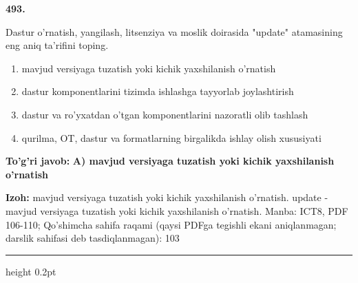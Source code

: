 \documentclass[10pt,a4paper]{article}
\begin{document}
{\bfseries\sffamily\color{ink} 493.}
\par
Dastur o'rnatish, yangilash, litsenziya va moslik doirasida "update" atamasining eng aniq ta'rifini toping.
\begin{enumerate}[label=\Alph*),leftmargin=9mm]
\item mavjud versiyaga tuzatish yoki kichik yaxshilanish o'rnatish
\item dastur komponentlarini tizimda ishlashga tayyorlab joylashtirish
\item dastur va ro'yxatdan o'tgan komponentlarini nazoratli olib tashlash
\item qurilma, OT, dastur va formatlarning birgalikda ishlay olish xususiyati
\end{enumerate}
\begin{tcolorbox}[enhanced,breakable,colback=teal!4,colframe=teal!60!black,boxrule=0.45pt,arc=1.2mm,left=2.7mm,right=2.7mm,top=1.8mm,bottom=1.8mm,before skip=2mm,after skip=2mm]
{\bfseries\sffamily\color{teal}To'g'ri javob:} \textbf{A) mavjud versiyaga tuzatish yoki kichik yaxshilanish o'rnatish}
\par\smallskip
{\bfseries Izoh:} mavjud versiyaga tuzatish yoki kichik yaxshilanish o'rnatish. update - mavjud versiyaga tuzatish yoki kichik yaxshilanish o'rnatish. Manba: ICT8, PDF 106-110; Qo'shimcha sahifa raqami (qaysi PDFga tegishli ekani aniqlanmagan; darslik sahifasi deb tasdiqlanmagan): 103
\end{tcolorbox}
\vspace{2mm}\hrule height 0.2pt\vspace{3mm}
\end{document}
